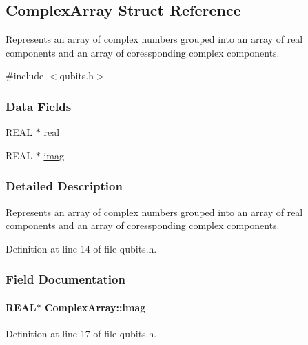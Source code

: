 \hypertarget{structComplexArray}{
\subsection{ComplexArray Struct Reference}
\label{structComplexArray}
}


Represents an array of complex numbers grouped into an array of real components and an array of coressponding complex components.  


{\ttfamily \#include $<$qubits.h$>$}\subsubsection*{Data Fields}
\begin{DoxyCompactItemize}
\item 
REAL $\ast$ \hyperlink{structComplexArray_a4195cac6c784ea1b6271f1c7dba1548a}{real}
\item 
REAL $\ast$ \hyperlink{structComplexArray_a79dde47c7ae530c79cebfdf57b225968}{imag}
\end{DoxyCompactItemize}


\subsubsection{Detailed Description}
Represents an array of complex numbers grouped into an array of real components and an array of coressponding complex components. 

Definition at line 14 of file qubits.h.

\subsubsection{Field Documentation}
\hypertarget{structComplexArray_a79dde47c7ae530c79cebfdf57b225968}{
\paragraph[{imag}]{\setlength{\rightskip}{0pt plus 5cm}REAL$\ast$ {\bf ComplexArray::imag}}\hfill}
\label{structComplexArray_a79dde47c7ae530c79cebfdf57b225968}


Definition at line 17 of file qubits.h.

